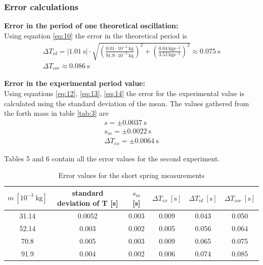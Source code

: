 \documentclass[a4paper, 10pt]{article}
\newcommand{\unit}[1]{~\mathrm{#1}}
\begin{document}
\begin{justify}
\subsubsection{Error calculations}
\textbf{Error in the period of one theoretical oscillation:}\\
Using equation \ref{eq:10} the error in the theoretical period is 
\begin{gather*}
    \Delta T_{id} = \left| 1.01\unit{s} \right| \cdot \sqrt{\left(\frac{0.01 \cdot 10^{-3}\unit{kg}}{91.9 \cdot 10^{-3}\unit{kg}}\right)^2 + \left(\frac{0.04 \unit{kg s^{-2}}}{3.52\unit{kg s^{-2}}}\right)^2} \approx 0.075\unit{s}\\
    \Delta T_{cor} \approx 0.086\unit{s}
\end{gather*}
\par
\textbf{Error in the experimental period value:}\\
Using equations \ref{eq:12}, \ref{eq:13}, \ref{eq:14} the error for the
experimental value is calculated using the standard deviation of the mean. The
values gathered from the forth mass in table \ref{tab:3} are
\begin{gather*}
    s = \pm0.0037\unit{s}\\
    s_m = \pm0.0022\unit{s}\\
    \Delta T_{ex} = \pm 0.0064\unit{s}
\end{gather*}
\par
Tables 5 and 6 contain all the error values for the second experiment.
\begin{table}[!h]
    \centering
    \caption{Error values for the short spring measurements}
    \begin{tabular}{|c|c|c|c|c|c|} 
    \hline
    $m~[10^{-3}\unit{kg}]$ & standard deviation of T [s] & $s_m$ [s] & $\Delta T_{ex}\unit{[s]}$ & $\Delta T_{id}\unit{[s]}$ &
    $\Delta T_{cor}\unit{[s]}$  \\ 
    \hline
    31.14            & 0.0052                     & 0.003                           & 0.009 & 0.043 & 0.050   \\ 
    \hline
    52.14            & 0.003                    & 0.002                           & 0.005 & 0.056 & 0.064   \\ 
    \hline
    70.8             & 0.005                    & 0.003                           & 0.009 & 0.065 & 0.075   \\ 
    \hline
    91.9             & 0.004                    & 0.002                            & 0.006  & 0.074 & 0.085   \\

\end{tabular}
\end{table}
\end{justify}
\end{document}
